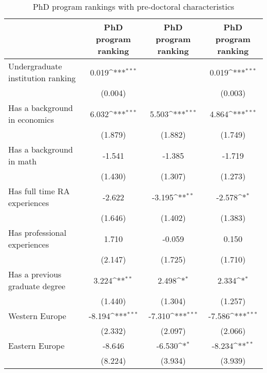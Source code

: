 \begin{table}[htbp]\centering
\def\sym#1{\ifmmode^{#1}\else\(^{#1}\)\fi}
\caption{PhD program rankings with pre-doctoral characteristics}
\begin{tabular}{l*{3}{c}}
\hline\hline
                    &\multicolumn{1}{c}{PhD program ranking}&\multicolumn{1}{c}{PhD program ranking}&\multicolumn{1}{c}{PhD program ranking}\\
\hline
Undergraduate institution ranking&       0.019\sym{***}&                     &       0.019\sym{***}\\
                    &     (0.004)         &                     &     (0.003)         \\
[1em]
Has a background in economics&       6.032\sym{***}&       5.503\sym{***}&       4.864\sym{***}\\
                    &     (1.879)         &     (1.882)         &     (1.749)         \\
[1em]
Has a background in math&      -1.541         &      -1.385         &      -1.719         \\
                    &     (1.430)         &     (1.307)         &     (1.273)         \\
[1em]
Has full time RA experiences&      -2.622         &      -3.195\sym{**} &      -2.578\sym{*}  \\
                    &     (1.646)         &     (1.402)         &     (1.383)         \\
[1em]
Has professional experiences&       1.710         &      -0.059         &       0.150         \\
                    &     (2.147)         &     (1.725)         &     (1.710)         \\
[1em]
Has a previous graduate degree&       3.224\sym{**} &       2.498\sym{*}  &       2.334\sym{*}  \\
                    &     (1.440)         &     (1.304)         &     (1.257)         \\
[1em]
Western Europe      &      -8.194\sym{***}&      -7.310\sym{***}&      -7.586\sym{***}\\
                    &     (2.332)         &     (2.097)         &     (2.066)         \\
[1em]
Eastern Europe      &      -8.646         &      -6.530\sym{*}  &      -8.234\sym{**} \\
                    &     (8.224)         &     (3.934)         &     (3.939)         \\

\end{tabular}
\end{table}
